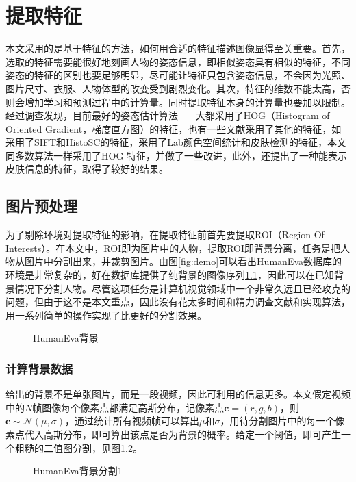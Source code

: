 

\chapter{提取特征}
\label{chap:feature}
本文采用的是基于特征的方法，如何用合适的特征描述图像显得至关重要。首先，选取的特征需要能很好地刻画人物的姿态信息，即相似姿态具有相似的特征，不同姿态的特征的区别也要足够明显，尽可能让特征只包含姿态信息，不会因为光照、图片尺寸、衣服、人物体型的改变受到剧烈变化。其次，特征的维数不能太高，否则会增加学习和预测过程中的计算量。同时提取特征本身的计算量也要加以限制。
经过调查发现，目前最好的姿态估计算法~\cite{ramanan2007learning}~\cite{yang2011articulated}~\cite{tian2012exploring} 大都采用了HOG（Histogram of Oriented Gradient，梯度直方图）的特征，也有一些文献采用了其他的特征，如\cite{bo2008fast}采用了SIFT和HistoSC的特征，\cite{eth_biwi_01027}采用了Lab颜色空间统计和皮肤检测的特征，本文同多数算法一样采用了HOG 特征，并做了一些改进，此外，还提出了一种能表示皮肤信息的特征，取得了较好的结果。
\section{图片预处理}
为了剔除环境对提取特征的影响，在提取特征前首先要提取ROI（Region Of Interests）。在本文中，ROI即为图片中的人物，提取ROI即背景分离，任务是把人物从图片中分割出来，并裁剪图片。由图\ref{fig:demo}可以看出HumanEva数据库的环境是非常复杂的，好在数据库提供了纯背景的图像序列\ref{fig:background}，因此可以在已知背景情况下分割人物。尽管这项任务是计算机视觉领域中一个非常久远且已经攻克的问题，但由于这不是本文重点，因此没有花太多时间和精力调查文献和实现算法，用一系列简单的操作实现了比\cite{Poppe2007}更好的分割效果。
\begin{figure}[htbp]
  \centering
  \caption{HumanEva背景}\label{fig:background}
\end{figure}
\subsection{计算背景数据}
给出的背景不是单张图片，而是一段视频，因此可利用的信息更多。本文假定视频中的$N$帧图像每个像素点都满足高斯分布，记像素点$\mathbf{c}=(r,g,b)$，则$\mathbf{c}\sim \mathcal{N}(\mu,\sigma)$，通过统计所有视频帧可以算出$\mu$和$\sigma$，用待分割图片中的每一个像素点代入高斯分布，即可算出该点是否为背景的概率。给定一个阈值，即可产生一个粗糙的二值图分割，见图\ref{fig:bk1}。
\begin{figure}[htbp]
  \centering
  \hspace{.5cm}
  \caption{HumanEva背景分割1}\label{fig:bk1}
\end{figure}

